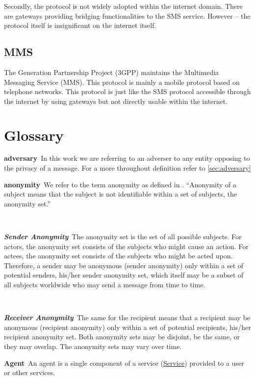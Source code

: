 \documentclass[a4paper,appendixprefix,pdfusetitle,twocolumn,fontsize=8pt,draft,DIV=calc]{scrbook}
\newenvironment{entry}{\par\leavevmode\hangpara{1.5mm}{1}\ignorespaces}{\RaggedRight\par}
\newcommand*{\mainentry}[2]{{\bfseries{#1\label{def:#1}}}~#2\par}
\newcommand*{\subentry}[2]{\par~\begin{minipage}{\columnwidth-0.6cm}{\bfseries{\itshape{#1\label{def:#1}}}}~#2\end{minipage}}
\newcommand*{\defref}[1]{\hyperref[def:#1]{#1}}
\begin{document}
Secondly, the protocol is not widely adopted within the internet domain. There are gateways providing bridging functionalities to the SMS service. However -- the protocol itself is insignificant on the internet itself. 

\section{MMS}
The  Generation Partnership Project (3GPP) maintains the Multimedia Messaging Service (MMS). This protocol is mainly a mobile protocol based on telephone networks. This protocol is just like the SMS protocol accessible through the internet by using gateways but not directly usable within the internet.

\clearpage\chapter{Glossary}

\begin{entry}
	\mainentry{adversary}{In this work we are referring to an adverser to any entity opposing to the privacy of a message. For a more throughout definition refer to \ref{sec:adversary}}
\end{entry}

\begin{entry}
	\mainentry{anonymity}{We refer to the term anonymity as defined in \cite{anonTerminology}. ``Anonymity of a subject means that the subject is not identifiable within a set of subjects, the anonymity set.''\omitted}
	\subentry{Sender Anonymity}{The anonymity set is the set of all possible subjects. For actors, the anonymity set consists of the subjects who might cause an action. For actees, the anonymity set consists of the subjects who might be acted upon. Therefore, a sender may be anonymous (sender anonymity) only within a set of potential senders, his/her sender anonymity set, which itself may be a subset of all subjects worldwide who may send a message from time to time.}
	\subentry{Receiver Anonymity}{The same for the recipient means that a recipient may be anonymous (recipient anonymity) only within a set of potential recipients, his/her recipient anonymity set. Both anonymity sets may be disjoint, be the same, or they may overlap. The anonymity sets may vary over time.}
\end{entry}

\begin{entry}
	\mainentry{Agent}{An agent is a single component of a service (\defref{Service}) provided to a user or other services.}
\end{entry}
\end{document}
